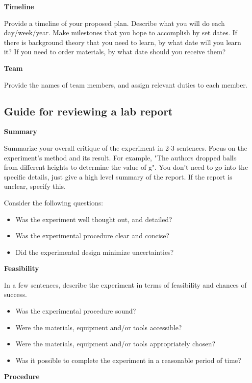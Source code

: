 \textbf{Timeline}

Provide a timeline of your proposed plan. Describe what you will do each day/week/year. Make milestones that you hope to accomplish by set dates. If there is background theory that you need to learn, by what date will you learn it? If you need to order materials, by what date should you receive them?

\textbf{Team}

Provide the names of team members, and assign relevant duties to each member. 

\newpage
\subsection{Guide for reviewing a lab report}
 \vspace{0.25cm}
\textbf{Summary}

Summarize your overall critique of the experiment in 2-3 sentences. Focus on the experiment's method and its result. For example, "The authors dropped balls from different heights to determine the value of g". You don't need to go into the specific details, just give a high level summary of the report. If the report is unclear, specify this.

Consider the following questions:
\begin{itemize}
\item Was the experiment well thought out, and detailed?
\item Was the experimental procedure clear and concise?
\item Did the experimental design minimize uncertainties?
\end{itemize}

\textbf{Feasibility}

In a few sentences, describe the experiment in terms of feasibility and chances of success. 

\begin{itemize}
\item Was the experimental procedure sound?
\item Were the materials, equipment and/or tools accessible? 
\item Were the materials, equipment and/or tools appropriately chosen?
\item Was it possible to complete the experiment in a reasonable period of time?
\end{itemize}

\textbf{Procedure}

